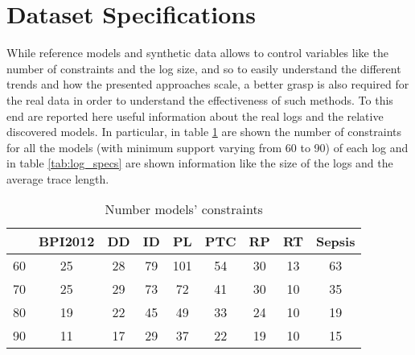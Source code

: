 \section{Dataset Specifications}
While reference models and synthetic data allows to control variables like the number of constraints and the log size, and so to easily understand the different trends and how the presented approaches scale, a better grasp is also required for the real data in order to understand the effectiveness of such methods. To this end are reported here useful information about the real logs and the relative discovered models. In particular, in table \ref{tab:number_constr} are shown the number of constraints for all the models (with minimum support varying from 60 to 90) of each log and in table \ref{tab:log_specs} are shown information like the size of the logs and the average trace length. 



\begin{table}[]
\centering
\caption{Number models' constraints}
\label{tab:number_constr}
\begin{tabular}{|c|c|c|c|c|c|c|c|c|}
\hline
   & BPI2012 &   DD &     ID &    PL & PTC &   RP &     RT &    Sepsis \\ 
\hline
60 & 25   & 28 & 79 & 101 & 54   & 30 & 13 & 63 \\
\hline
70 & 25   & 29 & 73 & 72  & 41   & 30 & 10 & 35 \\
\hline
80 & 19   & 22 & 45 & 49 & 33   & 24 & 10 & 19 \\
\hline
90 & 11    &  17 & 29 & 37      & 22  &  19 & 10 & 15 \\
\hline
\end{tabular}
\end{table}

\begin{table}[h]
\centering
\caption{Logs Specifications}
\label{tab:log_specs}
\end{table}

